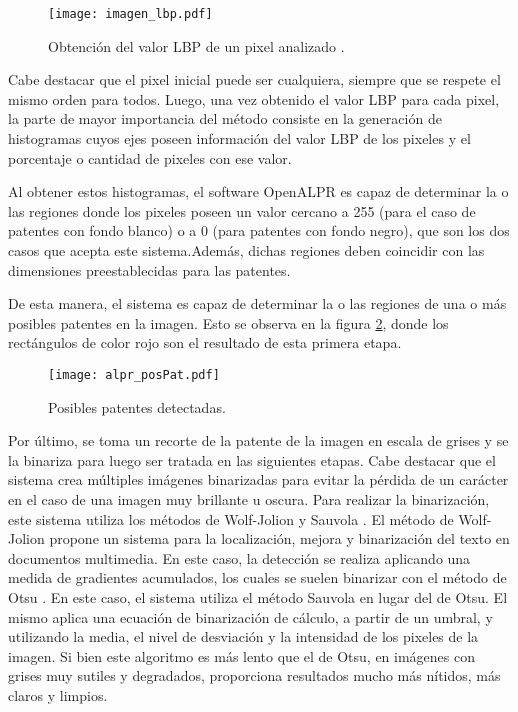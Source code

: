 \begin{figure}[H]
	\centering
	\texttt{[image: imagen\_lbp.pdf]}
	\caption{Obtención del valor LBP de un pixel analizado \cite{imglbp}.}
	\label{fig:img_imagen_lbp}
\end{figure}

Cabe destacar que el pixel inicial puede ser cualquiera, siempre que se respete el mismo orden para todos. Luego, una vez obtenido el valor LBP para cada pixel, la parte de mayor importancia del método consiste en la generación de histogramas cuyos ejes poseen información del valor LBP de los pixeles y el porcentaje o cantidad de pixeles con ese valor.

Al obtener estos histogramas, el software OpenALPR es capaz de determinar la o las regiones donde los pixeles poseen un valor cercano a 255 (para el caso de patentes con fondo blanco) o a 0 (para patentes con fondo negro), que son los dos casos que acepta este sistema.Además, dichas regiones deben coincidir con las dimensiones preestablecidas para las patentes.

 De esta manera, el sistema es capaz de determinar la o las regiones de una o más posibles patentes en la imagen. Esto se observa en la figura \ref{fig:img_pos_pat}, donde los rectángulos de color rojo son el resultado de esta primera etapa. 	

\begin{figure}[H]
	\centering
	\texttt{[image: alpr\_posPat.pdf]}
	\caption{Posibles patentes detectadas.}
	\label{fig:img_pos_pat}
\end{figure}

Por último, se toma un recorte de la patente de la imagen en escala de grises y se la binariza para luego ser tratada en las siguientes etapas. Cabe destacar que el sistema crea múltiples imágenes binarizadas para evitar la pérdida de un carácter en el caso de una imagen muy brillante u oscura. Para realizar la binarización, este sistema utiliza los métodos de Wolf-Jolion \cite{wolf2004} y Sauvola \cite{adaptive-document-binarization}. El método de Wolf-Jolion propone un sistema para la localización, mejora y binarización del texto en documentos multimedia. En este caso, la detección se realiza aplicando una medida de gradientes acumulados, los cuales se suelen binarizar con el método de Otsu \cite{revistaiberoamericana}. En este caso, el sistema utiliza el método Sauvola en lugar del de Otsu. El mismo aplica una ecuación de binarización de cálculo, a partir de un umbral, y utilizando la media, el nivel de desviación y la intensidad de los pixeles de la imagen. Si bien este algoritmo es más lento que el de Otsu, en imágenes con grises muy sutiles y degradados, proporciona resultados mucho más nítidos, más claros y limpios\cite{rmagro}.

